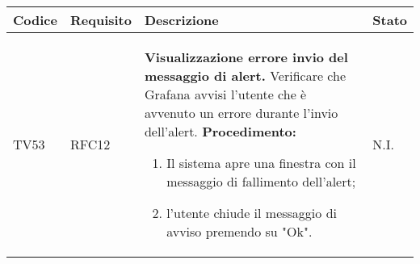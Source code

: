 \begin{table}[!htpb]
	\centering
	\renewcommand{\arraystretch}{2} 
	\begin{tabular}{|l|l|p{10cm}|l|}
		\rowcolor{orange!50}
		\hline
		\textbf{Codice} & \textbf{Requisito}& \textbf{Descrizione} & \textbf{Stato}\\ 
		\hline
		TV53 & RFC12 &
			\textbf{Visualizzazione errore invio del messaggio di alert.}
			\newline
			Verificare che Grafana avvisi l’utente che è avvenuto un errore durante l’invio dell’alert.
			\newline
			\textbf{Procedimento:}
			\begin{enumerate}
				\item Il sistema apre una finestra con il messaggio di fallimento dell'alert;
				\item l'utente chiude il messaggio di avviso premendo su "Ok".
			\end{enumerate} 
			& N.I.\\
		\hline
	\end{tabular}
\end{table}